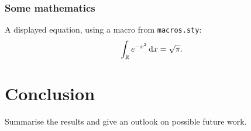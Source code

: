 \subsection{Some mathematics}

A displayed equation, using a macro from \texttt{macros.sty}:
\begin{equation}
  \label{eq:example}
  \int_{\mathbb{R}} e^{-x^2} \mathop{}\!\mathrm{d}x = \sqrt{\pi}.
\end{equation}

\chapter{Conclusion}
\label{chapter:conclusion}

Summarise the results and give an outlook on possible future work.

